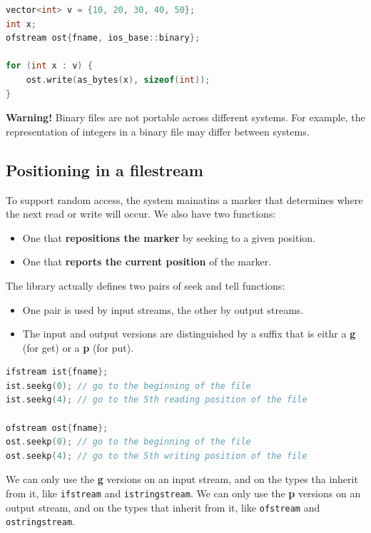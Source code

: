 \begin{lstlisting}[language=C++]
vector<int> v = {10, 20, 30, 40, 50};
int x;
ofstream ost{fname, ios_base::binary};

for (int x : v) {
    ost.write(as_bytes(x), sizeof(int));
}
\end{lstlisting}

\textbf{Warning!} Binary files are not portable across different systems. For example, the
representation of integers in a binary file may differ between systems.

\subsection{Positioning in a filestream}

To support random access, the system mainatins a marker that determines where the next read 
or write will occur. We also have two functions:
\begin{itemize}
    \item One that \textbf{repositions the marker} by seeking to a given position.
    \item One that \textbf{reports the current position} of the marker.
\end{itemize}

The library actually defines two pairs of seek and tell functions:
\begin{itemize}
    \item One pair is used by input streams, the other by output streams.
    \item The input and output versions are distinguished by a suffix that is eithr a \textbf{g}
    (for get) or a \textbf{p} (for put).
\end{itemize}

\begin{lstlisting}[language=C++]
ifstream ist{fname};
ist.seekg(0); // go to the beginning of the file
ist.seekg(4); // go to the 5th reading position of the file

ofstream ost{fname};
ost.seekp(0); // go to the beginning of the file
ost.seekp(4); // go to the 5th writing position of the file
\end{lstlisting}

We can only use the \textbf{g} versions on an input stream, and on the types tha inherit
from it, like \texttt{ifstream} and \texttt{istringstream}. We can only use the \textbf{p}
versions on an output stream, and on the types that inherit from it, like \texttt{ofstream}
and \texttt{ostringstream}.\\

